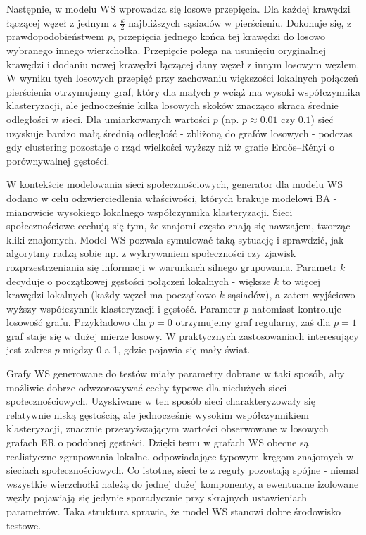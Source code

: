 Następnie, w modelu WS wprowadza się losowe przepięcia. Dla każdej krawędzi łączącej węzeł z jednym z $\frac{k}{2}$ najbliższych sąsiadów w pierścieniu. Dokonuje się, z prawdopodobieństwem $p$, przepięcia jednego końca tej krawędzi do losowo wybranego innego wierzchołka. Przepięcie polega na usunięciu oryginalnej krawędzi i dodaniu nowej krawędzi łączącej dany węzeł z innym losowym węzłem. W wyniku tych losowych przepięć przy zachowaniu większości lokalnych połączeń pierścienia otrzymujemy graf, który dla małych $p$ wciąż ma wysoki współczynnika klasteryzacji, ale jednocześnie kilka losowych skoków znacząco skraca średnie odległości w sieci. Dla umiarkowanych wartości $p$ (np. $p \approx 0.01$ czy $0.1$) sieć uzyskuje bardzo małą średnią odległość - zbliżoną do grafów losowych - podczas gdy clustering pozostaje o rząd wielkości wyższy niż w grafie Erdős--Rényi o porównywalnej gęstości.

W kontekście modelowania sieci społecznościowych, generator dla modelu WS dodano w celu odzwierciedlenia właściwości, których brakuje modelowi BA - mianowicie wysokiego lokalnego współczynnika klasteryzacji. Sieci społecznościowe cechują się tym, że znajomi często znają się nawzajem, tworząc kliki znajomych. Model WS pozwala symulować taką sytuację i sprawdzić, jak algorytmy radzą sobie np. z wykrywaniem społeczności czy zjawisk rozprzestrzeniania się informacji w warunkach silnego grupowania. Parametr $k$ decyduje o początkowej gęstości połączeń lokalnych - większe $k$ to więcej krawędzi lokalnych (każdy węzeł ma początkowo $k$ sąsiadów), a zatem wyjściowo wyższy współczynnik klasteryzacji i gęstość. Parametr $p$ natomiast kontroluje losowość grafu. Przykładowo dla $p=0$ otrzymujemy graf regularny, zaś dla $p=1$ graf staje się w dużej mierze losowy. W praktycznych zastosowaniach interesujący jest zakres $p$ między 0 a 1, gdzie pojawia się mały świat.

Grafy WS generowane do testów miały parametry dobrane w taki sposób, aby możliwie dobrze odwzorowywać cechy typowe dla niedużych sieci społecznościowych. Uzyskiwane w ten sposób sieci charakteryzowały się relatywnie niską gęstością, ale jednocześnie wysokim współczynnikiem klasteryzacji, znacznie przewyższającym wartości obserwowane w losowych grafach ER o podobnej gęstości. Dzięki temu w grafach WS obecne są realistyczne zgrupowania lokalne, odpowiadające typowym kręgom znajomych w sieciach społecznościowych. Co istotne, sieci te z reguły pozostają spójne - niemal wszystkie wierzchołki należą do jednej dużej komponenty, a ewentualne izolowane węzły pojawiają się jedynie sporadycznie przy skrajnych ustawieniach parametrów. Taka struktura sprawia, że model WS stanowi dobre środowisko testowe.


